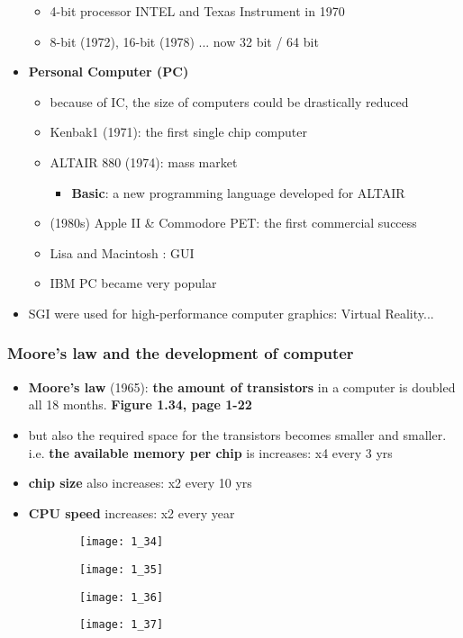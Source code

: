 \documentclass{standalone}
\begin{document}
\begin{itemize}
		\begin{itemize}
			\item 4-bit processor INTEL and Texas Instrument in 1970
			\item 8-bit (1972), 16-bit (1978) ... now 32 bit / 64 bit
		\end{itemize}
	\item \textbf{Personal Computer (PC)}
		\begin{itemize}
			\item because of IC, the size of computers could be drastically reduced
			\item Kenbak1 (1971): the first single chip computer
			\item ALTAIR 880 (1974): mass market
				\begin{itemize}
					\item \textbf{Basic}: a new programming language developed for ALTAIR
				\end{itemize}
			\item (1980s) Apple II \& Commodore PET: the first commercial success
			\item Lisa and Macintosh : GUI
			\item IBM PC became very popular
		\end{itemize}
	\item SGI were used for high-performance computer graphics: Virtual Reality...
\end{itemize}

\subsubsection*{Moore's law and the development of computer}

\begin{itemize}
	\item \textbf{Moore's law} (1965): \textbf{the amount of transistors} in a computer is doubled all 18 months. \textbf{Figure 1.34, page 1-22}
	\item but also the required space for the transistors becomes smaller and smaller. i.e. \textbf{the available memory per chip} is increases: x4 every 3 yrs
	\item \textbf{chip size} also increases: x2 every 10 yrs 
	\item \textbf{CPU speed} increases: x2 every year
\end{itemize}

\begin{figure}[H]
	\centering
	\begin{subfigure}[b]{0.45\textwidth}
		\texttt{[image: 1\_34]}
	\end{subfigure}
	\begin{subfigure}[b]{0.45\textwidth}
		\texttt{[image: 1\_35]}
	\end{subfigure}
	\begin{subfigure}[b]{0.45\textwidth}
		\texttt{[image: 1\_36]}
	\end{subfigure}
	\begin{subfigure}[b]{0.45\textwidth}
		\texttt{[image: 1\_37]}
	\end{subfigure}
\end{figure}
\end{document}
